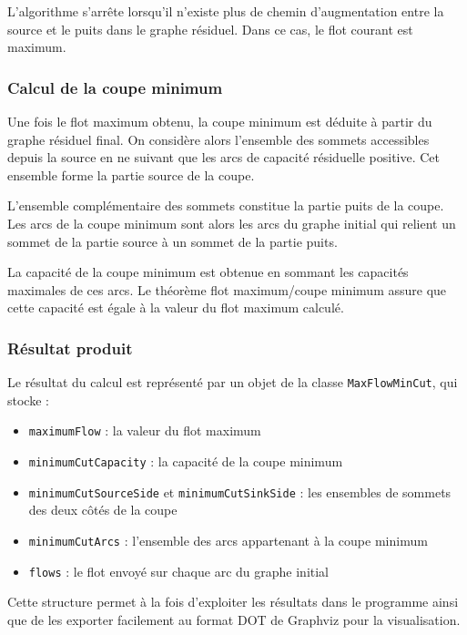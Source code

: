 \documentclass[titlepage]{article}
\begin{document}
L'algorithme s'arrête lorsqu'il n'existe plus de chemin d'augmentation entre la source et le puits dans le graphe résiduel. Dans ce cas, le flot courant est maximum.

\subsubsection{Calcul de la coupe minimum}

Une fois le flot maximum obtenu, la coupe minimum est déduite à partir du graphe résiduel final. On considère alors l'ensemble des sommets accessibles depuis la source en ne suivant que les arcs de capacité résiduelle positive. Cet ensemble forme la partie source de la coupe.

L'ensemble complémentaire des sommets constitue la partie puits de la coupe. Les arcs de la coupe minimum sont alors les arcs du graphe initial qui relient un sommet de la partie source à un sommet de la partie puits.

La capacité de la coupe minimum est obtenue en sommant les capacités maximales de ces arcs. Le théorème flot maximum/coupe minimum assure que cette capacité est égale à la valeur du flot maximum calculé.

\subsubsection{Résultat produit}

Le résultat du calcul est représenté par un objet de la classe \texttt{MaxFlowMinCut}, qui stocke :
\begin{itemize}
    \item \texttt{maximumFlow} : la valeur du flot maximum
    \item \texttt{minimumCutCapacity} : la capacité de la coupe minimum
    \item \texttt{minimumCutSourceSide} et \texttt{minimumCutSinkSide} : les ensembles de sommets des deux côtés de la coupe
    \item \texttt{minimumCutArcs} : l'ensemble des arcs appartenant à la coupe minimum
    \item \texttt{flows} : le flot envoyé sur chaque arc du graphe initial
\end{itemize}

Cette structure permet à la fois d'exploiter les résultats dans le programme ainsi que de les exporter facilement au format DOT de Graphviz pour la visualisation.


\clearpage
\end{document}
